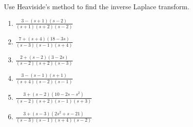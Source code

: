 \documentclass{ximera}
\begin{document}
\begin{problem}\label{exer:8.2.3}
 Use Heaviside's method to find the inverse Laplace transform.

\begin{enumerate}
    \item $\frac{3-(s+1)(s-2)}{(s+1)(s+2)(s-2)}$
    \item $\frac{7+(s+4)(18-3s)}{(s-3)(s-1)(s+4)}$
    \item $\frac{2+(s-2)(3-2s)}{(s-2)(s+2)(s-3)}$
    \item $\frac{3-(s-1)(s+1)}{(s+4)(s-2)(s-1)}$
    \item $\frac{3+(s-2)(10-2s-s^2)}{(s-2)(s+2)(s-1)(s+3)}$
    \item $\frac{3+(s-3)(2s^2+s-21)}{(s-3)(s-1)(s+4)(s-2)}$
\end{enumerate}
\end{problem}
\end{document}
